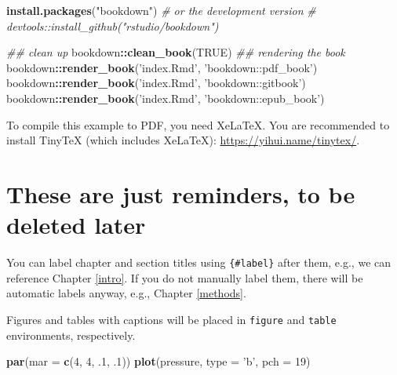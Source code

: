 \documentclass[12pt,]{book}
\newenvironment{Shaded}{\begin{snugshade}}{\end{snugshade}}
\newcommand{\CommentTok}[1]{\textcolor[rgb]{0.56,0.35,0.01}{\textit{#1}}}
\newcommand{\DataTypeTok}[1]{\textcolor[rgb]{0.13,0.29,0.53}{#1}}
\newcommand{\DecValTok}[1]{\textcolor[rgb]{0.00,0.00,0.81}{#1}}
\newcommand{\FloatTok}[1]{\textcolor[rgb]{0.00,0.00,0.81}{#1}}
\newcommand{\KeywordTok}[1]{\textcolor[rgb]{0.13,0.29,0.53}{\textbf{#1}}}
\newcommand{\NormalTok}[1]{#1}
\newcommand{\OperatorTok}[1]{\textcolor[rgb]{0.81,0.36,0.00}{\textbf{#1}}}
\newcommand{\OtherTok}[1]{\textcolor[rgb]{0.56,0.35,0.01}{#1}}
\newcommand{\StringTok}[1]{\textcolor[rgb]{0.31,0.60,0.02}{#1}}
\begin{document}
\begin{Shaded}
\begin{Highlighting}[]
\KeywordTok{install.packages}\NormalTok{(}\StringTok{"bookdown"}\NormalTok{)}
\CommentTok{# or the development version}
\CommentTok{# devtools::install_github("rstudio/bookdown")}

\CommentTok{## clean up }
\NormalTok{bookdown}\OperatorTok{::}\KeywordTok{clean_book}\NormalTok{(}\OtherTok{TRUE}\NormalTok{)}
\CommentTok{## rendering the book}
\NormalTok{bookdown}\OperatorTok{::}\KeywordTok{render_book}\NormalTok{(}\StringTok{'index.Rmd'}\NormalTok{, }\StringTok{'bookdown::pdf_book'}\NormalTok{)}
\NormalTok{bookdown}\OperatorTok{::}\KeywordTok{render_book}\NormalTok{(}\StringTok{'index.Rmd'}\NormalTok{, }\StringTok{'bookdown::gitbook'}\NormalTok{)}
\NormalTok{bookdown}\OperatorTok{::}\KeywordTok{render_book}\NormalTok{(}\StringTok{'index.Rmd'}\NormalTok{, }\StringTok{'bookdown::epub_book'}\NormalTok{)}
\end{Highlighting}
\end{Shaded}

To compile this example to PDF, you need XeLaTeX. You are recommended to install TinyTeX (which includes XeLaTeX): \url{https://yihui.name/tinytex/}.

\hypertarget{these-are-just-reminders-to-be-deleted-later}{%
\section{These are just reminders, to be deleted later}\label{these-are-just-reminders-to-be-deleted-later}}

You can label chapter and section titles using \texttt{\{\#label\}} after them, e.g., we can reference Chapter \ref{intro}. If you do not manually label them, there will be automatic labels anyway, e.g., Chapter \ref{methods}.

Figures and tables with captions will be placed in \texttt{figure} and \texttt{table} environments, respectively.

\begin{Shaded}
\begin{Highlighting}[]
\KeywordTok{par}\NormalTok{(}\DataTypeTok{mar =} \KeywordTok{c}\NormalTok{(}\DecValTok{4}\NormalTok{, }\DecValTok{4}\NormalTok{, }\FloatTok{.1}\NormalTok{, }\FloatTok{.1}\NormalTok{))}
\KeywordTok{plot}\NormalTok{(pressure, }\DataTypeTok{type =} \StringTok{'b'}\NormalTok{, }\DataTypeTok{pch =} \DecValTok{19}\NormalTok{)}
\end{Highlighting}
\end{Shaded}
\end{document}
